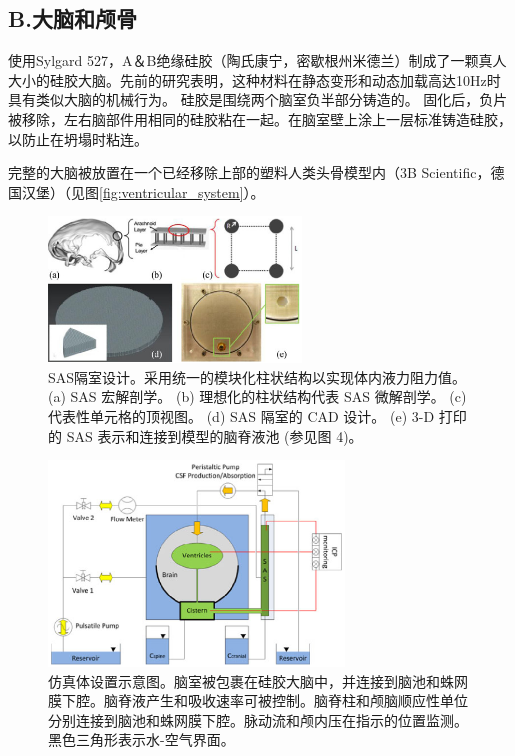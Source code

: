 \documentclass[12pt]{article}
\begin{document}
\subsection*{B.大脑和颅骨}
使用Sylgard 527，A＆B绝缘硅胶（陶氏康宁，密歇根州米德兰）制成了一颗真人大小的硅胶大脑。先前的研究表明，这种材料在静态变形和动态加载高达10Hz时具有类似大脑的机械行为。
硅胶是围绕两个脑室负半部分铸造的。
固化后，负片被移除，左右脑部件用相同的硅胶粘在一起。在脑室壁上涂上一层标准铸造硅胶，以防止在坍塌时粘连。

完整的大脑被放置在一个已经移除上部的塑料人类头骨模型内（3B Scientific，德国汉堡）（见图\ref{fig:ventricular_system}）。
\begin{figure}[h]
    \centering
    \includegraphics[width=0.6\textwidth]{Figures/2.png}
    \caption{SAS隔室设计。采用统一的模块化柱状结构以实现体内液力阻力值。 (a) SAS 宏解剖学。 (b) 理想化的柱状结构代表 SAS 微解剖学。 (c) 代表性单元格的顶视图。 (d) SAS 隔室的 CAD 设计。 (e) 3-D 打印的 SAS 表示和连接到模型的脑脊液池 (参见图 4)。}
    \label{fig:silicone_brain}
\end{figure}

\begin{figure}[h]
    \centering
    \includegraphics[width=0.7\textwidth]{Figures/3.png}
    \caption{仿真体设置示意图。脑室被包裹在硅胶大脑中，并连接到脑池和蛛网膜下腔。脑脊液产生和吸收速率可被控制。脑脊柱和颅脑顺应性单位分别连接到脑池和蛛网膜下腔。脉动流和颅内压在指示的位置监测。黑色三角形表示水-空气界面。}
    \label{fig:model_assembly}
\end{figure}
\end{document}
